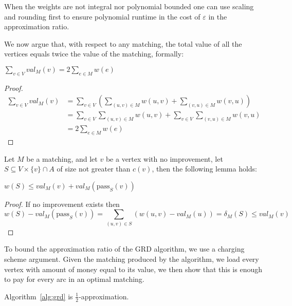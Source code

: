 \begin{remark}
When the weights are not integral nor polynomial bounded one can use scaling and
rounding first to ensure polynomial runtime in the cost of $\varepsilon$ in the
approximation ratio.
\end{remark}


We now argue that, with respect to any matching, 
the total value of all the vertices equals twice the value of the matching, 
formally: 
\begin{lemma}
\label{lm:val-twice}
$\sum_{v \in V} val_M(v) = 2 \sum_{e \in M} w(e)$
\end{lemma}

\begin{proof}
\begin{equation}
\begin{split}
\sum_{v \in V} val_M(v)	& = 
\sum_{v \in V} \left( \sum_{(u, v) \in M} w(u, v) + \sum_{(v, u) \in M} w(v, u) \right)	\\
						& = \sum_{v \in V}\sum_{(u, v) \in M} w(u, v) + 
							\sum_{v \in V}\sum_{(v, u) \in M} w(v, u)					\\
						& = 2 \sum_{e \in M} w(e)
\end{split}
\end{equation}
\end{proof}

Let $M$ be a matching, and let $v$ be a vertex with no improvement,
let $S \subseteq V \times \{v\} \cap A$ of size not greater than $c(v)$,
then the following lemma holds:

\begin{lemma}
\label{lm:no improve}
$w(S) \leq val_M(v) + val_M(\text{pass}_S(v))$
\end{lemma}

\begin{proof}
If no improvement exists then
$$
w(S) - val_M(\text{pass}_S(v))=
\sum_{(u,v) \in S}(w(u,v) - val_M(u)) =
\delta_M(S) 
\leq val_M(v)
$$
\end{proof}

To bound the approximation ratio of the GRD algorithm, 
we use a charging scheme argument.
Given the matching produced by the algorithm, 
we load every vertex with amount of money equal to its value,
we then show that this is enough to pay for every arc in an optimal matching.   

\begin{theorem}
Algorithm~\ref{alg:grd} is $\frac{1}{2}$-approximation.
\end{theorem}

